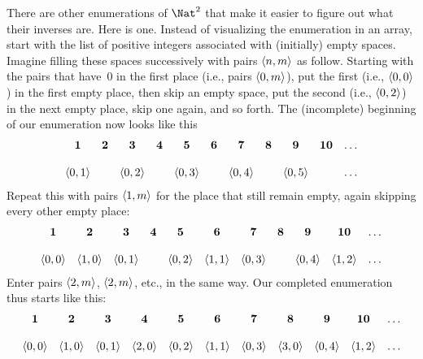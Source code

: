 \documentclass[../../../include/open-logic-section]{subfiles}
\begin{document}


\begin{explain}
There are other enumerations of $\Nat^2$ that make it easier to
figure out what their inverses are. Here is one. Instead of
visualizing the enumeration in an array, start with the list of
positive integers associated with (initially) empty spaces. Imagine
filling these spaces successively with pairs $\langle n,m \rangle$ as follow.
Starting with the pairs that have~$0$ in  the first place (i.e., pairs
$\langle 0,m \rangle$), put the first (i.e., $\langle 0,0 \rangle$) in the first empty
place, then skip an empty space, put the second (i.e., $\langle 0,2 \rangle$)
in the next empty place, skip one again, and so forth. The
(incomplete) beginning of our enumeration now looks like this
\[
\begin{array}{c c c c c c c c c c c}
\textbf 1 & \textbf 2 & \textbf 3 & \textbf 4 & \textbf 5 & \textbf 6 & \textbf 7 & \textbf 8 & \textbf 9 & \textbf{10} & \dots \\ \\
\tuple{0,1} &  & \tuple{0,2} &  & \tuple{0,3} & & \tuple{0,4} &  & \tuple{0,5} &  & \dots \\
\end{array}
\]
Repeat this with pairs $\langle 1,m \rangle$ for the place that still remain
empty, again skipping every other empty place:
\[
\begin{array}{c c c c c c c c c c c}
\textbf 1 & \textbf 2 & \textbf 3 & \textbf 4 & \textbf 5 & \textbf 6 & \textbf 7 & \textbf 8 & \textbf 9 & \textbf{10} & \dots \\ \\
\tuple{0,0} & \tuple{1,0} & \tuple{0,1} &  & \tuple{0,2} & \tuple{1,1} & 
\tuple{0,3} & & \tuple{0,4} &  \tuple{1,2} & \dots \\
\end{array}
\]
Enter pairs $\langle 2,m \rangle$, $\langle 2,m \rangle$, etc., in the same way. Our
completed enumeration thus starts like this:
\[
\begin{array}{c c c c c c c c c c c}
\textbf 1 & \textbf 2 & \textbf 3 & \textbf 4 & \textbf 5 & \textbf 6 & \textbf 7 & \textbf 8 & \textbf 9 & \textbf{10} & \dots \\ \\
\tuple{0,0} & \tuple{1,0} & \tuple{0,1} & \tuple{2,0}  & \tuple{0,2} & 
\tuple{1,1} & \tuple{0,3} & \tuple{3,0}  & \tuple{0,4} &  \tuple{1,2} & \dots \\
\end{array}
\]
\end{explain}
\end{document}
